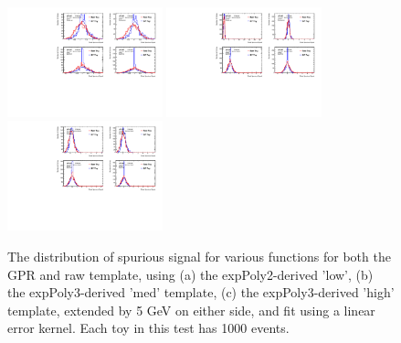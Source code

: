\begin{figure} 
\begin{center}
  \includegraphics[width=0.4\textwidth]{figures/background/gpr/validation/linear/ToyTest_FitSigVals_lowpT_1000_noSig}   
  \includegraphics[width=0.4\textwidth]{figures/background/gpr/validation/linear/ToyTest_FitSigVals_medpT_1000_noSig}   
  \includegraphics[width=0.4\textwidth]{figures/background/gpr/validation/linear/ToyTest_FitSigVals_highpT_1000_noSig}   
\caption{The distribution of spurious signal for various functions for both the GPR and raw template, using (a) the expPoly2-derived 'low', (b) the expPoly3-derived 'med' template, (c) the expPoly3-derived 'high' template, extended by 5 GeV on either side, and fit using a linear error kernel. Each toy in this test has 1000 events.}
\label{fig:linearkernel_lowpt_1000_noSig}
\end{center}
\end{figure}

